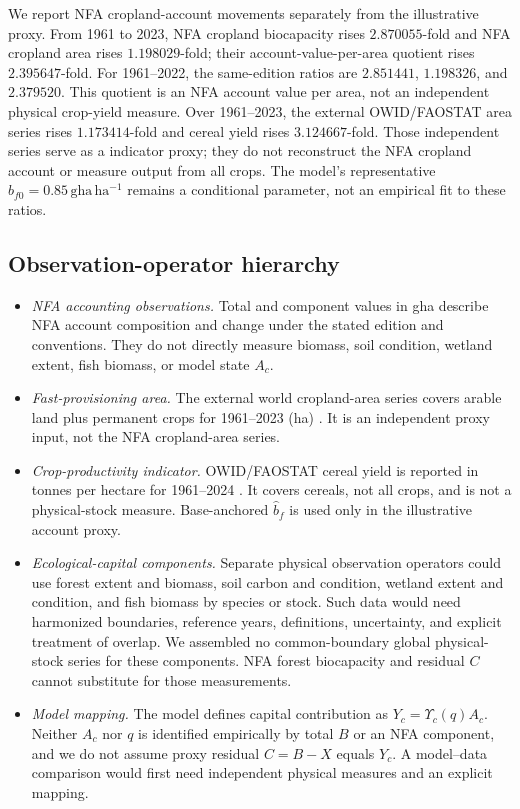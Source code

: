 \documentclass[11pt,a4paper]{article}
\newcommand{\Ups}{\Upsilon_c}
\begin{document}
We report NFA cropland-account movements separately from the illustrative proxy. From 1961 to 2023, NFA cropland biocapacity rises $2.870055$-fold and NFA cropland area rises $1.198029$-fold; their account-value-per-area quotient rises $2.395647$-fold. For 1961--2022, the same-edition ratios are $2.851441$, $1.198326$, and $2.379520$. This quotient is an NFA account value per area, not an independent physical crop-yield measure. Over 1961--2023, the external OWID/FAOSTAT area series rises $1.173414$-fold and cereal yield rises $3.124667$-fold. Those independent series serve as a indicator proxy; they do not reconstruct the NFA cropland account or measure output from all crops. The model's representative $b_{f0}=0.85\,\mathrm{gha\,ha^{-1}}$ remains a conditional parameter, not an empirical fit to these ratios.

\subsection{Observation-operator hierarchy}\label{si:operator}

\begin{itemize}[leftmargin=1.5em]
\item \emph{NFA accounting observations.} Total and component values in gha describe NFA account composition and change under the stated edition and conventions. They do not directly measure biomass, soil condition, wetland extent, fish biomass, or model state $A_c$.
\item \emph{Fast-provisioning area.} The external world cropland-area series covers arable land plus permanent crops for 1961--2023 (ha) \citep{OWIDCropland2026}. It is an independent proxy input, not the NFA cropland-area series.
\item \emph{Crop-productivity indicator.} OWID/FAOSTAT cereal yield is reported in tonnes per hectare for 1961--2024 \citep{OWIDCereal2026}. It covers cereals, not all crops, and is not a physical-stock measure. Base-anchored $\hat b_f$ is used only in the illustrative account proxy.
\item \emph{Ecological-capital components.} Separate physical observation operators could use forest extent and biomass, soil carbon and condition, wetland extent and condition, and fish biomass by species or stock. Such data would need harmonized boundaries, reference years, definitions, uncertainty, and explicit treatment of overlap. We assembled no common-boundary global physical-stock series for these components. NFA forest biocapacity and residual $C$ cannot substitute for those measurements.
\item \emph{Model mapping.} The model defines capital contribution as $Y_c=\Ups(q)A_c$. Neither $A_c$ nor $q$ is identified empirically by total $B$ or an NFA component, and we do not assume proxy residual $C=B-X$ equals $Y_c$. A model--data comparison would first need independent physical measures and an explicit mapping.
\end{itemize}
\end{document}
